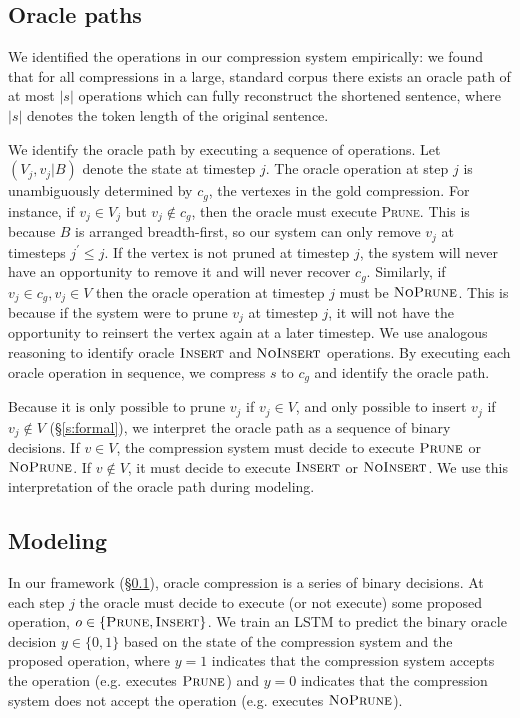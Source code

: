 \documentclass[11pt,a4paper]{article}
\begin{document}
\subsection{Oracle paths}\label{s:oracle}

We identified the operations in our compression system empirically: we found that for all compressions in a large, standard corpus \cite{filippova2013overcoming} there exists an oracle path of at most $|s|$ operations which can fully reconstruct the shortened sentence, where $|s|$ denotes the token length of the original sentence.

We identify the oracle path by executing  a sequence of operations. Let $(V_j, v_j | B)$ denote the state at timestep $j$. The oracle operation at step $j$ is unambiguously determined by $c_g$, the vertexes in the gold compression. For instance, if $v_j \in V_j$ but $v_j \notin c_g$, then the oracle must execute \textsc{Prune}. This is because $B$ is arranged breadth-first, so our system can only remove $v_j$ at timesteps $j^{\prime} \leq j$. If the vertex is not pruned at timestep $j$, the system will never have an opportunity to remove it and will never recover $c_g$. Similarly, if $v_j \in c_g, v_j \in V$ then the oracle operation at timestep $j$ must be $\textsc{NoPrune}$. This is because if the system were to prune $v_j$ at timestep $j$, it will not have the opportunity to reinsert the vertex again at a later timestep. We use analogous reasoning to identify oracle $\textsc{Insert}$ and $\textsc{NoInsert}$ operations. By executing each oracle operation in sequence, we compress $s$ to $c_g$ and identify the oracle path.

Because it is only possible to prune $v_j$ if $v_j \in V$, and only possible to insert $v_j$ if $v_j \notin V$ (\S\ref{s:formal}), we interpret the oracle path as a sequence of binary decisions. If $v \in V$, the compression system must decide to execute $\textsc{Prune}$ or $\textsc{NoPrune}$. If $v \notin V$, it must decide to execute $\textsc{Insert}$ or $\textsc{NoInsert}$. We use this interpretation of the oracle path during modeling.

\subsection{Modeling}\label{s:modeling}

In our framework (\S\ref{s:oracle}), oracle compression is a series of binary decisions. At each step $j$ the oracle must decide to execute (or not execute) some proposed operation, $o \in \{\textsc{Prune}, \textsc{Insert}\}$. We train an LSTM to predict the binary oracle decision $y \in \{0,1\}$ based on the state of the compression system and the proposed operation, where $y=1$ indicates that the compression system accepts the operation (e.g. executes $\textsc{Prune}$) and $y=0$ indicates that the compression system does not accept the operation (e.g. executes $\textsc{NoPrune}$).
\end{document}
